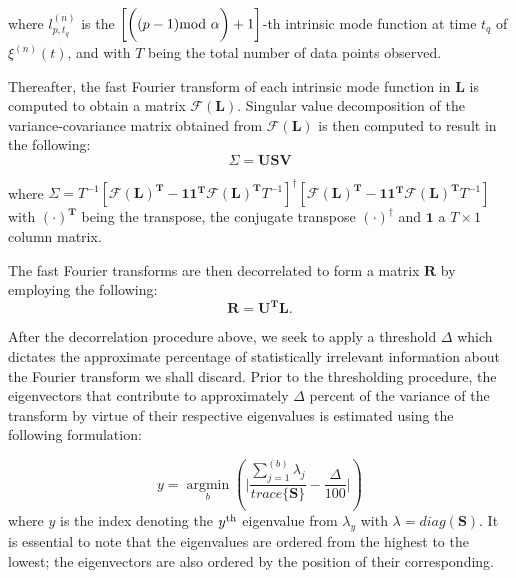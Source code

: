 \documentclass[onecolumn, groupedaddress, 10pt]{revtex4-1}
\begin{document}
where $l_{p,t_q}^{(n)}$ is the $\left[ \bigg( (p-1) \textnormal{mod } \alpha \bigg) + 1\right]$-th intrinsic mode function at time $t_q$ of $\xi^{(n)}(t)$, and with $T$ being the total number of data points observed.

Thereafter, the fast Fourier transform of each intrinsic mode function in $\mathbf{L}$ is computed to obtain a matrix $\mathcal{F} \left( \mathbf{L} \right)$. Singular value decomposition of the variance-covariance matrix obtained from $\mathcal{F}{ \left( \mathbf{L} \right) }$ is then computed to result in the following:
\begin{equation}
\Sigma = \mathbf{USV}
\end{equation}
 
where $\Sigma = T^{-1} \left[ \mathcal{F}(\mathbf{L}) ^{\mathbf{T}} - \mathbf{1}\mathbf{1}^{\mathbf{T}} \mathcal{F}(\mathbf{L})^{\mathbf{T}} T^{-1} \right]^{ \dagger } \left[ \mathcal{F}(\mathbf{L})^{\mathbf{T}} - \mathbf{1}\mathbf{1}^{\mathbf{T}} \mathcal{F}( \mathbf{L})^{\mathbf{T}} T^{-1} \right] $with $(\cdot)^\mathbf{T}$ being the transpose, the conjugate transpose $(\cdot)^\dagger$ and $\mathbf{1}$ a $T \times 1$ column matrix.


The fast Fourier transforms are then decorrelated to form a matrix $\mathbf{R}$ by employing the following:
\begin{equation}
\mathbf{R} = \mathbf{U}^{\mathbf{T}}\mathbf{L}.
\end{equation}

After the decorrelation procedure above, we seek to apply a threshold $\Delta$ which dictates the approximate percentage of statistically irrelevant information about the Fourier transform we shall discard. Prior to the thresholding procedure, the eigenvectors that contribute to approximately $\Delta$ percent of the variance of the transform by virtue of their respective eigenvalues is estimated using the following formulation:

\begin{equation}
y = \underset{b}{\operatorname{argmin}} \left( \Bigg| \frac{\sum_{j=1}^{(b)} \lambda_j}{trace \{ \mathbf{S} \}} - \frac{\Delta}{100} \Bigg| \right)
\end{equation}
where $y$ is the index denoting the $y^\textnormal{th}$ eigenvalue from $\lambda_y$ with $\lambda = diag{(\mathbf{S})}$. It is essential to note that the eigenvalues are ordered from the highest to the lowest; the eigenvectors are also ordered by the position of their corresponding.
\end{document}
